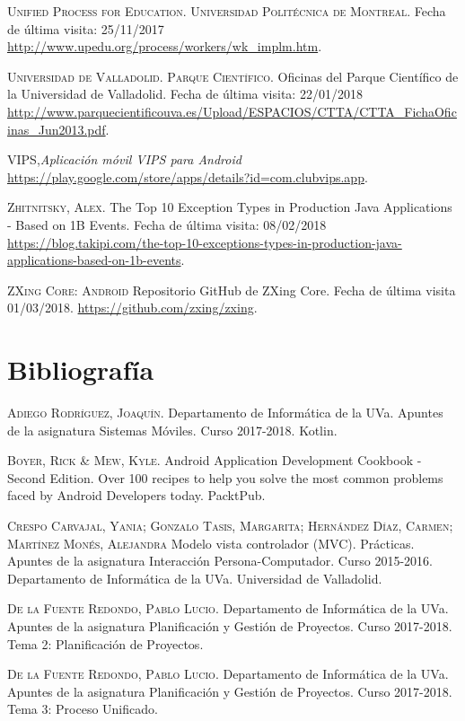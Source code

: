 \documentclass[twoside]{report}
\begin{document}
\begin{thebibliography}{a}
 \textsc{Unified Process for Education. Universidad Politécnica de Montreal}. Fecha de última visita: 25/11/2017 \url{http://www.upedu.org/process/workers/wk_implm.htm}.

 \textsc{Universidad de Valladolid. Parque Científico}. Oficinas del Parque Científico de la Universidad de Valladolid. Fecha de última visita: 22/01/2018 \url{http://www.parquecientificouva.es/Upload/ESPACIOS/CTTA/CTTA_FichaOficinas_Jun2013.pdf}.

 \textsc{VIPS},\textit{Aplicación móvil VIPS para Android} \url{https://play.google.com/store/apps/details?id=com.clubvips.app}.

 \textsc{Zhitnitsky, Alex}. The Top 10 Exception Types in Production Java Applications - Based on 1B Events. Fecha de última visita: 08/02/2018 \url{https://blog.takipi.com/the-top-10-exceptions-types-in-production-java-applications-based-on-1b-events}.

 \textsc{ZXing Core: Android} 
Repositorio GitHub de ZXing Core. Fecha de última visita 01/03/2018. \url{https://github.com/zxing/zxing}.

\section{Bibliografía}

 \textsc{Adiego Rodríguez, Joaquín}. Departamento de Informática de la UVa. Apuntes de la asignatura Sistemas Móviles. Curso 2017-2018. Kotlin.

 \textsc{Boyer, Rick \& Mew, Kyle}. Android Application Development Cookbook - Second Edition. Over 100 recipes to help you solve the most common problems faced by Android Developers today. PacktPub.

 \textsc{Crespo Carvajal, Yania; Gonzalo Tasis, Margarita; Hernández Díaz, Carmen; Martínez Monés, Alejandra} Modelo vista controlador (MVC). Prácticas. Apuntes de la asignatura Interacción Persona-Computador. Curso 2015-2016. Departamento de Informática de la UVa. Universidad de Valladolid. 

 \textsc{De la Fuente Redondo, Pablo Lucio}. Departamento de Informática de la UVa. Apuntes de la asignatura Planificación y Gestión de Proyectos. Curso 2017-2018. Tema 2: Planificación de Proyectos.

 \textsc{De la Fuente Redondo, Pablo Lucio}. Departamento de Informática de la UVa. Apuntes de la asignatura Planificación y Gestión de Proyectos. Curso 2017-2018. Tema 3: Proceso Unificado.


\end{thebibliography}
\end{document}
